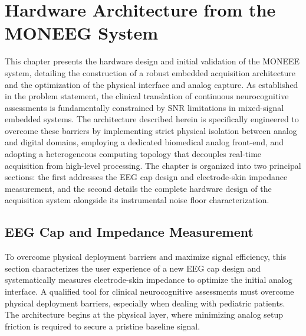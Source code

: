 \chapter{Hardware Architecture from the MONEEG System}
\label{ch:hardware_architecture}

This chapter presents the hardware design and initial validation of the MONEEE system, detailing the construction of a robust embedded acquisition architecture and the optimization of the physical interface and analog capture. As established in the problem statement, the clinical translation of continuous neurocognitive assessments is fundamentally constrained by SNR limitations in mixed-signal embedded systems. The architecture described herein is specifically engineered to overcome these barriers by implementing strict physical isolation between analog and digital domains, employing a dedicated biomedical analog front-end, and adopting a heterogeneous computing topology that decouples real-time acquisition from high-level processing. The chapter is organized into two principal sections: the first addresses the EEG cap design and electrode-skin impedance measurement, and the second details the complete hardware design of the acquisition system alongside its instrumental noise floor characterization.


\section{EEG Cap and Impedance Measurement}
\label{sec:eeg_cap_impedance}

To overcome physical deployment barriers and maximize signal efficiency, this section characterizes the user experience of a new EEG cap design and systematically measures electrode-skin impedance to optimize the initial analog interface. A qualified tool for clinical neurocognitive assessments must overcome physical deployment barriers, especially when dealing with pediatric patients. The architecture begins at the physical layer, where minimizing analog setup friction is required to secure a pristine baseline signal.

